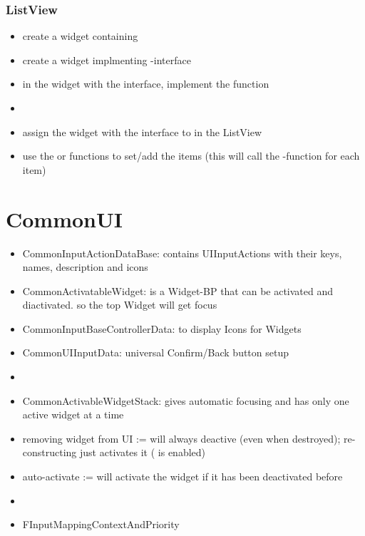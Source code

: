         \subsubsection{ListView}
            \begin{itemize}
                \item create a widget containing 
                \item create a widget implmenting -interface
                \item in the widget with the interface, implement the  function
                \item 
                \item assign the widget with the interface to  in the ListView
                \item use the  or  functions to set/add the items (this will call the -function for each item)
            \end{itemize}

            
    \section{CommonUI}

        \begin{itemize}
            \item CommonInputActionDataBase: contains UIInputActions with their keys, names, description and icons
            \item CommonActivatableWidget: is a Widget-BP that can be activated and diactivated. so the top Widget will get focus
            \item CommonInputBaseControllerData: to display Icons for Widgets
            \item CommonUIInputData: universal Confirm/Back button setup
            \item 
            \item CommonActivableWidgetStack: gives automatic focusing and has only one active widget at a time
            \item removing widget from UI := will always deactive (even when destroyed); re-constructing just activates it ( is enabled)
            \item auto-activate := will activate the widget if it has been deactivated before
            \item 
            \item FInputMappingContextAndPriority %
        \end{itemize}

